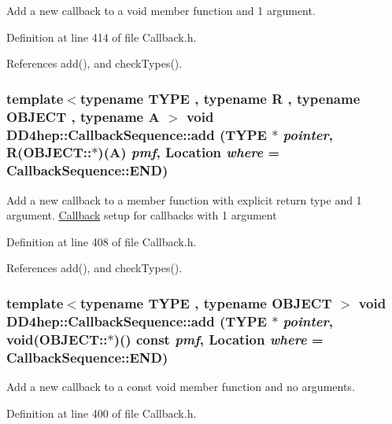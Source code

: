 Add a new callback to a void member function and 1 argument. 

Definition at line 414 of file Callback.h.

References add(), and checkTypes().\hypertarget{struct_d_d4hep_1_1_callback_sequence_a1af126fe7c1fd9b2d7df9c4946b25507}{
\subsubsection[{add}]{\setlength{\rightskip}{0pt plus 5cm}template$<$typename TYPE , typename R , typename OBJECT , typename A $>$ void DD4hep::CallbackSequence::add (TYPE $\ast$ {\em pointer}, \/  R(OBJECT::$\ast$)(A) {\em pmf}, \/  {\bf Location} {\em where} = {\ttfamily CallbackSequence::END})}}
\label{struct_d_d4hep_1_1_callback_sequence_a1af126fe7c1fd9b2d7df9c4946b25507}


Add a new callback to a member function with explicit return type and 1 argument. \hyperlink{class_d_d4hep_1_1_callback}{Callback} setup for callbacks with 1 argument 

Definition at line 408 of file Callback.h.

References add(), and checkTypes().\hypertarget{struct_d_d4hep_1_1_callback_sequence_a6924856939e0486f5afc0f7847c098cb}{
\subsubsection[{add}]{\setlength{\rightskip}{0pt plus 5cm}template$<$typename TYPE , typename OBJECT $>$ void DD4hep::CallbackSequence::add (TYPE $\ast$ {\em pointer}, \/  void(OBJECT::$\ast$)() const  {\em pmf}, \/  {\bf Location} {\em where} = {\ttfamily CallbackSequence::END})}}
\label{struct_d_d4hep_1_1_callback_sequence_a6924856939e0486f5afc0f7847c098cb}


Add a new callback to a const void member function and no arguments. 

Definition at line 400 of file Callback.h.

